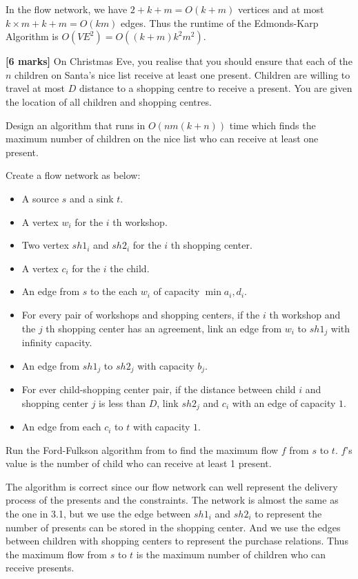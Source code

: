 \documentclass{article}
\begin{document}
\begin{Question}
\begin{answer}
In the flow network, we have $2 + k+m = O(k+m)$ vertices and at most $k\times m + k + m =O(km)$ edges. Thus the runtime of the Edmonds-Karp Algorithm is $O(VE^2) = O((k+m)k^2m^2)$.  
\end{answer}

\begin{Subquestion}
\textbf{[6 marks]} 
On Christmas Eve, you realise that you should ensure that each of the $n$ children on Santa's nice list receive at least one present. Children are willing to travel at most $D$ distance to a shopping centre to receive a present. You are given the location of all children and shopping centres.

Design an algorithm that runs in $O(nm(k+n))$ time which finds the maximum number of children on the nice list who can receive at least one present. 
\end{Subquestion}

\begin{answer}
Create a flow network as below:
\begin{itemize}
    \item A source $s$ and a sink $t$.
    \item A vertex $w_i$ for the $i$ th workshop.
    \item Two vertex $sh1_i$ and $sh2_i$ for the $i$ th shopping center.
    \item A vertex $c_i$ for the $i$ the child.
    \item An edge from $s$ to the each $w_i$ of capacity $\min{a_i, d_i}$.
    \item For every pair of workshops and shopping centers, if the $i$ th workshop and the $j$ th shopping center has an agreement, link an edge from $w_i$ to $sh1_j$ with infinity capacity.
    \item An edge from $sh1_j$ to $sh2_j$ with capacity $b_j$.
    \item For ever child-shopping center pair, if the distance between child $i$ and shopping center $j$ is less than $D$, link $sh2_j$ and $c_i$ with an edge of capacity $1$.
    \item An edge from each $c_i$ to $t$ with capacity  $1$.
\end{itemize}
Run the Ford-Fulkson algorithm from to find the maximum flow $f$ from $s$ to $t$. $f$'s value is the number of child who can receive at least 1 present.

The algorithm is correct since our flow network can well represent the delivery process of the presents and the constraints. The network is almost the same as the one 
in 3.1, but we use the edge between $sh1_i$ and $sh2_i$ to represent the number of presents can be stored in the shopping center.
And we use the edges between children with shopping centers to represent the purchase relations.
Thus the maximum flow from $s$ to $t$ is the maximum number of children who can receive presents.


\end{answer}
\end{Question}
\end{document}
